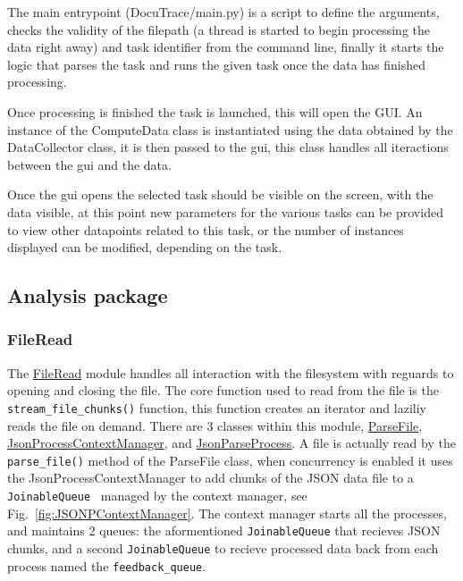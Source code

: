 \documentclass[11pt]{article}
\newcommand{\code}[1]{\colorbox{light-gray}{\texttt{#1}}}
\begin{document}
The main entrypoint (DocuTrace/main.py) is a script to define the arguments, checks the validity of the filepath (a thread is started to begin processing the data right away) and task identifier from the command line, finally it starts the logic that parses the task and runs the given task once the data has finished processing.

Once processing is finished the task is launched, this will open the GUI. 
An instance of the ComputeData class is instantiated using the data obtained by the DataCollector class, it is then passed to the gui, this class handles all iteractions between the gui and the data.

Once the gui opens the selected task should be visible on the screen, with the data visible, at this point new parameters for the various tasks can be provided to view other datapoints related to this task, or the number of instances displayed can be modified, depending on the task.

\subsection{Analysis package}
\subsubsection{FileRead}\label{sec:FileRead}
The \href{https://www2.macs.hw.ac.uk/~sf52/DocuTrace/html/DocuTrace.Analysis.html#module-DocuTrace.Analysis.FileRead}{FileRead} module handles all interaction with the filesystem with reguards to opening and closing the file. The core function used to read from the file is the \code{stream\_file\_chunks()} function, this function creates an iterator and laziliy reads the file on demand. 
There are 3 classes within this module, \href{https://www2.macs.hw.ac.uk/~sf52/DocuTrace/html/DocuTrace.Analysis.html#DocuTrace.Analysis.FileRead.ParseFile}{ParseFile}, \href{https://www2.macs.hw.ac.uk/~sf52/DocuTrace/html/DocuTrace.Analysis.html#DocuTrace.Analysis.FileRead.JsonProcessContextManager}{JsonProcessContextManager}, and \href{https://www2.macs.hw.ac.uk/~sf52/DocuTrace/html/DocuTrace.Analysis.html#DocuTrace.Analysis.FileRead.ParseFile}{JsonParseProcess}. 
A file is actually read by the \code{parse\_file()} method of the ParseFile class, when concurrency is enabled it uses the JsonProcessContextManager to add chunks of the JSON data file to a \code{JoinableQueue}~\autocite{MultiprocessingProcessbasedParallelism} managed by the context manager, see Fig.~\ref{fig:JSONPContextManager}.
The context manager starts all the processes, and maintains 2 queues: the aformentioned \code{JoinableQueue} that recieves JSON chunks, and a second \code{JoinableQueue} to recieve processed data back from each process named the \code{feedback\_queue}.
\end{document}
